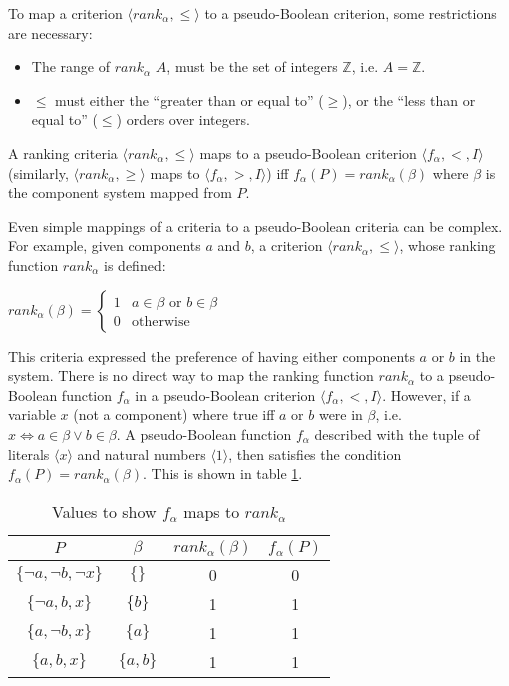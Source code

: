To map a criterion $\langle rank_{\alpha},\leq \rangle$ to a pseudo-Boolean criterion,
some restrictions are necessary:
\begin{itemize}
  \item The range of $rank_{\alpha}$ $A$, must be the set of integers $\mathbb{Z}$, i.e. $A = \mathbb{Z}$.
  \item $\leq$ must either the ``greater than or equal to'' ($\geq$), or the ``less than or equal to'' ($\leq$) orders over integers.
\end{itemize} 

\begin{defs}
A ranking criteria $\langle rank_{\alpha},\leq \rangle$ maps to a pseudo-Boolean criterion  $\langle f_{\alpha}, < , I \rangle$ 
(similarly, $\langle rank_{\alpha},\geq \rangle $ maps to $ \langle f_{\alpha}, > , I \rangle$) iff
$f_{\alpha}(P) = rank_{\alpha}(\beta)$ where $\beta$ is the component system mapped from $P$. 
\end{defs}

Even simple mappings of a criteria to a pseudo-Boolean criteria can be complex.
For example, given components $a$ and $b$, a criterion $\langle rank_{\alpha},\leq \rangle$, whose ranking function $rank_{\alpha}$ is defined:

$rank_{\alpha}(\beta) = \begin{cases} 1 & a \in \beta \text{ or } b \in \beta\\ 0 & \text{otherwise} \end{cases}$

This criteria expressed the preference of having either components $a$ or $b$ in the system.
There is no direct way to map the ranking function $rank_{\alpha}$ to a pseudo-Boolean function $f_{\alpha}$ in a pseudo-Boolean criterion $\langle f_{\alpha}, < , I \rangle$.
However, if a variable $x$ (not a component) where true iff $a$ or $b$ were in $\beta$, i.e. $x \Leftrightarrow a \in \beta \vee b \in \beta$.
A pseudo-Boolean function $f_{\alpha}$ described with the tuple of literals $\langle x \rangle$ and natural numbers $\langle 1 \rangle$,
then satisfies the condition $f_{\alpha}(P) = rank_{\alpha}(\beta)$.
This is shown in table \ref{impl.critmapexmp}.
\begin{table}[h!]
\centering
\begin{tabular}{| c | c | c | c |}
\hline
$P$								&	$\beta$			& $rank_{\alpha}(\beta)$ 	& $f_{\alpha}(P)$\\ \hline	
$\{\neg a, \neg b, \neg x\}$ 	& $\{\}$				& 0						& 0 \\
$\{\neg a,  b, x\}$ 			& $\{b\}$				& 1						& 1 \\
$\{ a,  \neg b, x\}$ 			& $\{a\}$				& 1						& 1 \\
$\{ a,  b, x\}$ 				& $\{a,b\}$				& 1						& 1 \\ \hline
\end{tabular}
\caption{Values to show $f_{\alpha}$  maps to $rank_{\alpha}$}
\label{impl.critmapexmp}
\end{table}

